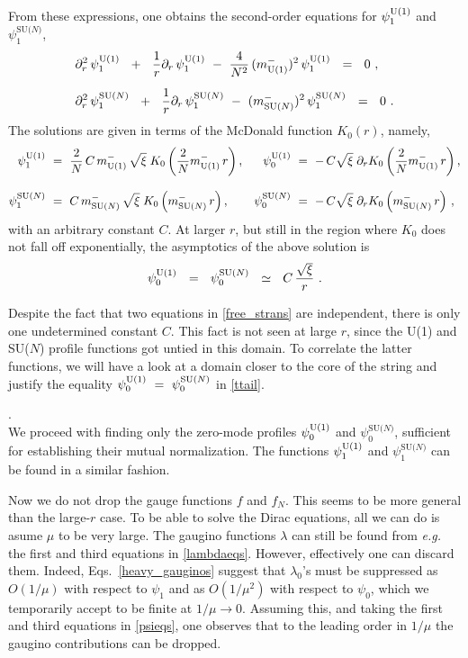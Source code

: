 \documentclass[12pt]{article}
\def\beq{\begin{equation}}
\def\eeq{\end{equation}}
\newcommand{\p}{\partial}
\newcommand{\mUm}{m_{\rm U(1)}^{-}}
\newcommand{\mNm}{m_\text{SU($N$)}^{-}}
\newcommand{\poU}{\psi_0^{\rm U(1)}}
\newcommand{\plU}{\psi_1^{\rm U(1)}}
\newcommand{\poN}{\psi_0^\text{SU($N$)}}
\newcommand{\plN}{\psi_1^\text{SU($N$)}}
\begin{document}
	From these expressions, one obtains the second-order equations for $ \plU $ and $ \plN $,
\begin{align}
%
\notag
	& \p_r^2\, \plU  ~~+~~ \frac{1}{r}\p_r\, \plU ~-~ \frac{4}{N^2}\,(\mUm)^2\, \plU  ~~=~~ 0~, 
	\\[2mm]
%
\label{free_strans}
	& \p_r^2\, \plN  ~~+~~ \frac{1}{r}\p_r\, \plN ~-~ (\mNm)^2\, \plN ~~=~~ 0~.
\end{align}
	The solutions are given in terms of  the McDonald function $ K_0(r) $, namely,
\begin{align*}
%
	\plU & ~=~ \frac{2}{N}\,C\,\mUm\,\sqrt{\xi}\;K_0\left(\frac{2}{N}\mUm\,r\right)  ,
&
	\poU & ~=~ -\,C\sqrt{\xi}\; \p_r K_0\left(\frac{2}{N}\mUm\,r\right),
\\[3mm]
%
	\plN & ~=~ C\,\mNm\,\sqrt{\xi}\; K_0\left(\mNm\, r\right),
&
	\poN & ~=~ -\,C\sqrt{\xi}\; \p_r K_0\left(\mNm\,r\right)\,,
\end{align*}
	with an arbitrary constant $ C $.
	At larger $ r $, but still in the region where $ K_0 $ does not fall off exponentially,
	the asymptotics of the above solution is
\beq
\label{ttail}
	\poU ~~=~~ \poN ~~\simeq~~ C\,\frac{\sqrt{\xi}}{r}~.
\eeq

	Despite the fact that two equations in \eqref{free_strans} are independent,
	there is only one undetermined constant $ C $.
	This fact is not seen at large $ r $, since the U(1) and SU($N$) profile functions got untied
	in this domain.
	To correlate the latter functions, we will have a look at a domain closer to the core of the string and
	justify the equality $ \poU ~=~ \poN $ in \eqref{ttail}.

	{.}\\[2mm]
We proceed with finding only the zero-mode profiles $ \poU $ and $ \poN $, 
sufficient for establishing
	their mutual normalization.
	The functions $ \plU $ and $ \plN $ can be found in a similar fashion. 

	Now we do not drop the gauge functions $ f $ and $ f_N$.
	This seems to be more general than the large-$ r $ case.
	To be able to solve the Dirac equations, all we can do is asume $ \mu $ to be very large.
	The gaugino functions $ \lambda $ can still be found from {\it e.g.} the first and 
	third equations in \eqref{lambdaeqs}.
	However, effectively one can discard them.
	Indeed, Eqs.~\eqref{heavy_gauginos} suggest that $ \lambda_0 $'s must be suppressed as $ O(1/\mu) $
	with respect to $ \psi_1 $ and as $ O(1/\mu^2) $ with respect to $ \psi_0 $, which we temporarily
	accept to be finite at $ 1/\mu \to 0 $.
	Assuming this, and taking the first and third equations in \eqref{psieqs}, one observes
	that to the leading order in $ 1/\mu $ the gaugino contributions can be dropped.
\end{document}
